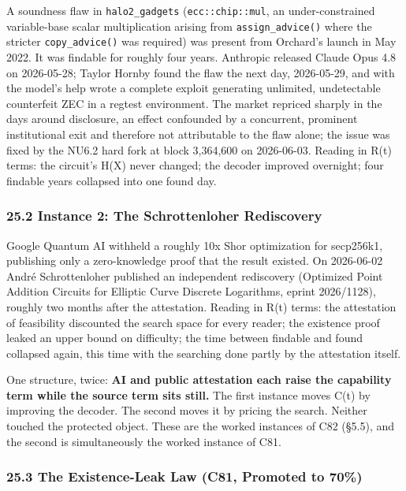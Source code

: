\documentclass[
]{article}
\begin{document}
A soundness flaw in \texttt{halo2\_gadgets} (\texttt{ecc::chip::mul}, an
under-constrained variable-base scalar multiplication arising from
\texttt{assign\_advice()} where the stricter \texttt{copy\_advice()} was
required) was present from Orchard's launch in May 2022. It was findable
for roughly four years. Anthropic released Claude Opus 4.8 on
2026-05-28; Taylor Hornby found the flaw the next day, 2026-05-29, and
with the model's help wrote a complete exploit generating unlimited,
undetectable counterfeit ZEC in a regtest environment. The market
repriced sharply in the days around disclosure, an effect confounded by
a concurrent, prominent institutional exit and therefore not
attributable to the flaw alone; the issue was fixed by the NU6.2 hard
fork at block 3,364,600 on 2026-06-03. Reading in R(t) terms: the
circuit's H(X) never changed; the decoder improved overnight; four
findable years collapsed into one found day.

\subsubsection{25.2 Instance 2: The Schrottenloher
Rediscovery}\label{instance-2-the-schrottenloher-rediscovery}

Google Quantum AI withheld a roughly 10x Shor optimization for
secp256k1, publishing only a zero-knowledge proof that the result
existed. On 2026-06-02 André Schrottenloher published an independent
rediscovery (Optimized Point Addition Circuits for Elliptic Curve
Discrete Logarithms, eprint 2026/1128), roughly two months after the
attestation. Reading in R(t) terms: the attestation of feasibility
discounted the search space for every reader; the existence proof leaked
an upper bound on difficulty; the time between findable and found
collapsed again, this time with the searching done partly by the
attestation itself.

One structure, twice: \textbf{AI and public attestation each raise the
capability term while the source term sits still.} The first instance
moves C(t) by improving the decoder. The second moves it by pricing the
search. Neither touched the protected object. These are the worked
instances of C82 (§5.5), and the second is simultaneously the worked
instance of C81.

\subsubsection{25.3 The Existence-Leak Law (C81, Promoted to
70\%)}\label{the-existence-leak-law-c81-promoted-to-70}
\end{document}
